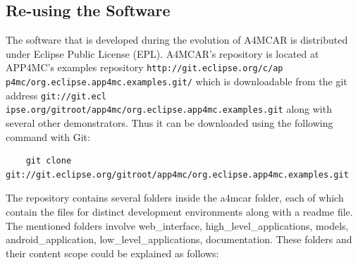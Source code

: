 \subsection{Re-using the Software}
The software that is developed during the evolution of A4MCAR is distributed under Eclipse Public License (EPL). A4MCAR's repository is located at APP4MC's examples repository \texttt{http://git.eclipse.org/c/ap p4mc/org.eclipse.app4mc.examples.git/} which is downloadable from the git address \texttt{git://git.ecl ipse.org/gitroot/app4mc/org.eclipse.app4mc.examples.git} along with several other demonstrators. Thus it can be downloaded using the following command with Git:
\begin{lstlisting}
	git clone git://git.eclipse.org/gitroot/app4mc/org.eclipse.app4mc.examples.git
\end{lstlisting}

The repository contains several folders inside the a4mcar folder, each of which contain the files for distinct development environments along with a readme file. The mentioned folders involve web{\_}interface, high{\_}level{\_}applications, models, android{\_}application, low{\_}level{\_}applications, documentation. These folders and their content scope could be explained as follows:


